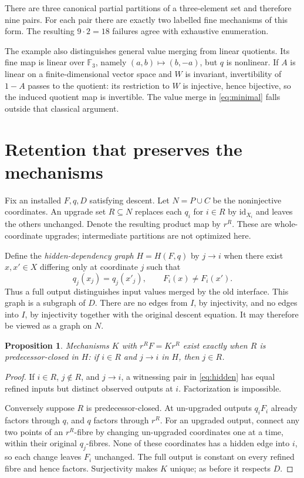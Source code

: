 \documentclass[11pt,a4paper]{article}
\newtheorem{proposition}[theorem]{Proposition}
\theoremstyle{definition}
\theoremstyle{remark}
\newcommand{\id}{\mathrm{id}}
\begin{document}
There are three canonical partial partitions of a three-element set and therefore nine pairs. For each pair there are exactly two labelled fine mechanisms of this form. The resulting $9\cdot2=18$ failures agree with exhaustive enumeration.

The example also distinguishes general value merging from linear quotients. Its fine map is linear over $\mathbb F_3$, namely $(a,b)\mapsto(b,-a)$, but $q$ is nonlinear. If $A$ is linear on a finite-dimensional vector space and $W$ is invariant, invertibility of $1-A$ passes to the quotient: its restriction to $W$ is injective, hence bijective, so the induced quotient map is invertible. The value merge in \eqref{eq:minimal} falls outside that classical argument.

\section{Retention that preserves the mechanisms}

Fix an installed $F,q,D$ satisfying descent. Let $N=P\cup C$ be the noninjective coordinates. An upgrade set $R\subseteq N$ replaces each $q_i$ for $i\in R$ by $\id_{X_i}$ and leaves the others unchanged. Denote the resulting product map by $r^R$. These are whole-coordinate upgrades; intermediate partitions are not optimized here.

Define the \emph{hidden-dependency graph} $H=H(F,q)$ by $j\to i$ when there exist $x,x'\in X$ differing only at coordinate $j$ such that
\begin{equation}\label{eq:hidden}
 q_j(x_j)=q_j(x'_j),\qquad F_i(x)\ne F_i(x').
\end{equation}
Thus a full output distinguishes input values merged by the old interface. This graph is a subgraph of $D$. There are no edges from $I$, by injectivity, and no edges into $I$, by injectivity together with the original descent equation. It may therefore be viewed as a graph on $N$.

\begin{proposition}\label{prop:descent}
Mechanisms $K$ with $r^RF=Kr^R$ exist exactly when $R$ is predecessor-closed in $H$: if $i\in R$ and $j\to i$ in $H$, then $j\in R$.
\end{proposition}
\begin{proof}
If $i\in R$, $j\notin R$, and $j\to i$, a witnessing pair in \eqref{eq:hidden} has equal refined inputs but distinct observed outputs at $i$. Factorization is impossible.

Conversely suppose $R$ is predecessor-closed. At un-upgraded outputs $q_iF_i$ already factors through $q$, and $q$ factors through $r^R$. For an upgraded output, connect any two points of an $r^R$-fibre by changing un-upgraded coordinates one at a time, within their original $q_j$-fibres. None of these coordinates has a hidden edge into $i$, so each change leaves $F_i$ unchanged. The full output is constant on every refined fibre and hence factors. Surjectivity makes $K$ unique; as before it respects $D$.
\end{proof}
\end{document}
